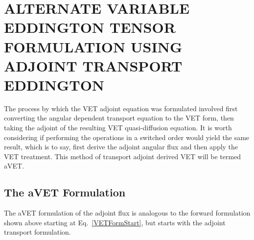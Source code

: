 \documentclass[12pt]{report}
\begin{document}
\chapter{\uppercase {ALternate Variable Eddington Tensor Formulation Using Adjoint Transport Eddington}} \label{chap:aVET}
The process by which the VET adjoint equation was formulated involved first converting the angular dependent transport equation to the VET form, then taking the adjoint of the resulting VET quasi-diffusion equation. It is worth considering if performing the operations in a switched order would yield the same result, which is to say, first derive the adjoint  angular flux and then apply the VET treatment. This method of transport adjoint derived VET will be termed aVET.

\section{The aVET Formulation}
The aVET formulation of the adjoint flux is analogous to the forward formulation shown above starting at Eq.~\eqref{VETFormStart}, but starts with the adjoint transport formulation. 
\end{document}
